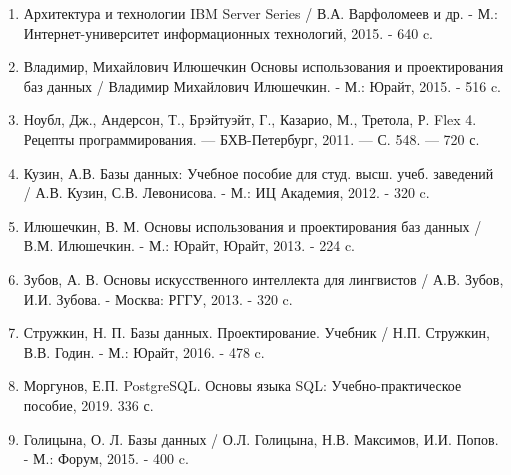 \documentclass[14pt]{extarticle}
\begin{document}
    \begin{enumerate}
        \item Архитектура и технологии IBM Server Series / В.А. Варфоломеев и др. - М.: Интернет-университет информационных технологий, 2015. - 640 c.
        \item Владимир, Михайлович Илюшечкин Основы использования и проектирования баз данных / Владимир Михайлович Илюшечкин. - М.: Юрайт, 2015. - 516 c.
        \item Ноубл, Дж., Андерсон, Т., Брэйтуэйт, Г., Казарио, М., Третола, Р. Flex 4. Рецепты программирования. — БХВ-Петербург, 2011. — С. 548. — 720 с.
        \item Кузин, А.В. Базы данных: Учебное пособие для студ. высш. учеб. заведений / А.В. Кузин, С.В. Левонисова. - М.: ИЦ Академия, 2012. - 320 c.

        \item Илюшечкин, В. М. Основы использования и проектирования баз данных / В.М. Илюшечкин. - М.: Юрайт, Юрайт, 2013. - 224 c.
        \item Зубов, А. В. Основы искусственного интеллекта для лингвистов / А.В. Зубов, И.И. Зубова. - Москва: РГГУ, 2013. - 320 c.
        \item Стружкин, Н. П. Базы данных.
        Проектирование. Учебник / Н.П. Стружкин, В.В. Годин. - М.: Юрайт, 2016. - 478 c.
        \item Моргунов, Е.П. PostgreSQL. Основы языка SQL: Учебно-практическое пособие, 2019. 336 с.
        \item Голицына, О. Л. Базы данных / О.Л. Голицына, Н.В. Максимов, И.И. Попов. - М.: Форум, 2015. - 400 c.
    \end{enumerate}
\end{document}
